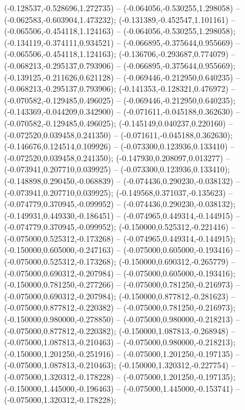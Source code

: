  (-0.128537,-0.528696,1.272735) -- (-0.064056,-0.530255,1.298058) -- (-0.062583,-0.603904,1.473232);
 (-0.131389,-0.452547,1.101161) -- (-0.065506,-0.454118,1.124163) -- (-0.064056,-0.530255,1.298058);
 (-0.134119,-0.374111,0.934521) -- (-0.066895,-0.375644,0.955669) -- (-0.065506,-0.454118,1.124163);
 (-0.136706,-0.293687,0.774079) -- (-0.068213,-0.295137,0.793906) -- (-0.066895,-0.375644,0.955669);
 (-0.139125,-0.211626,0.621128) -- (-0.069446,-0.212950,0.640235) -- (-0.068213,-0.295137,0.793906);
 (-0.141353,-0.128321,0.476972) -- (-0.070582,-0.129485,0.496025) -- (-0.069446,-0.212950,0.640235);
 (-0.143369,-0.044209,0.342900) -- (-0.071611,-0.045188,0.362630) -- (-0.070582,-0.129485,0.496025);
 (-0.145149,0.040237,0.220160) -- (-0.072520,0.039458,0.241350) -- (-0.071611,-0.045188,0.362630);
 (-0.146676,0.124514,0.109926) -- (-0.073300,0.123936,0.133410) -- (-0.072520,0.039458,0.241350);
 (-0.147930,0.208097,0.013277) -- (-0.073941,0.207710,0.039925) -- (-0.073300,0.123936,0.133410);
 (-0.148898,0.290450,-0.068839) -- (-0.074436,0.290230,-0.038132) -- (-0.073941,0.207710,0.039925);
 (-0.149568,0.371037,-0.135623) -- (-0.074779,0.370945,-0.099952) -- (-0.074436,0.290230,-0.038132);
 (-0.149931,0.449330,-0.186451) -- (-0.074965,0.449314,-0.144915) -- (-0.074779,0.370945,-0.099952);
 (-0.150000,0.525312,-0.221416) -- (-0.075000,0.525312,-0.173268) -- (-0.074965,0.449314,-0.144915);
 (-0.150000,0.605000,-0.247163) -- (-0.075000,0.605000,-0.193416) -- (-0.075000,0.525312,-0.173268);
 (-0.150000,0.690312,-0.265779) -- (-0.075000,0.690312,-0.207984) -- (-0.075000,0.605000,-0.193416);
 (-0.150000,0.781250,-0.277266) -- (-0.075000,0.781250,-0.216973) -- (-0.075000,0.690312,-0.207984);
 (-0.150000,0.877812,-0.281623) -- (-0.075000,0.877812,-0.220382) -- (-0.075000,0.781250,-0.216973);
 (-0.150000,0.980000,-0.278850) -- (-0.075000,0.980000,-0.218213) -- (-0.075000,0.877812,-0.220382);
 (-0.150000,1.087813,-0.268948) -- (-0.075000,1.087813,-0.210463) -- (-0.075000,0.980000,-0.218213);
 (-0.150000,1.201250,-0.251916) -- (-0.075000,1.201250,-0.197135) -- (-0.075000,1.087813,-0.210463);
 (-0.150000,1.320312,-0.227754) -- (-0.075000,1.320312,-0.178228) -- (-0.075000,1.201250,-0.197135);
 (-0.150000,1.445000,-0.196463) -- (-0.075000,1.445000,-0.153741) -- (-0.075000,1.320312,-0.178228);
